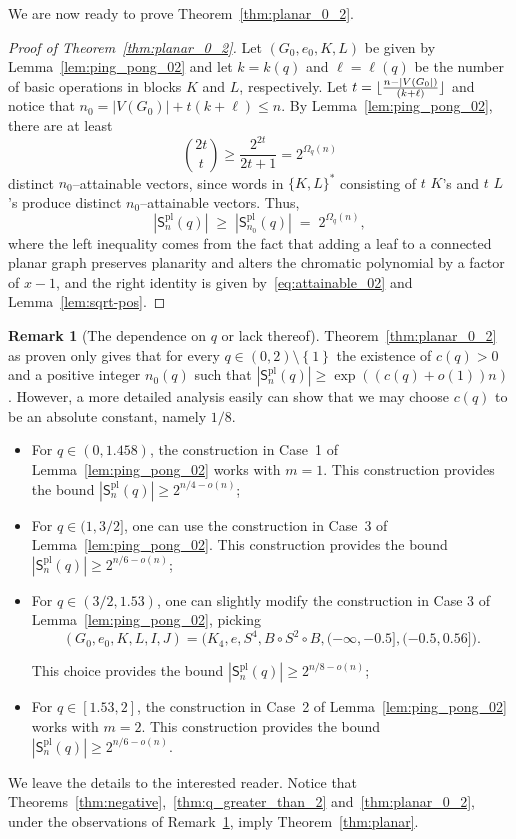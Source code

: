 \documentclass[A4paper,reqno,oneside,12pt]{amsart}
\theoremstyle{plain}
\theoremstyle{definition}
\newtheorem{remark}[theorem]{Remark}
\newcommand{\abs}[1]{\left| #1 \right|}
\newcommand{\of}[1]{\left( #1 \right)}
\DeclareMathOperator{\pl}{\mathrm{pl}}
\newcommand{\set}[1]{\left\{ #1 \right\}}
\begin{document}
We are now ready to prove Theorem~\ref{thm:planar_0_2}.

\begin{proof}[Proof of Theorem~\ref{thm:planar_0_2}]
Let $(G_0,e_0,K,L)$ be given by Lemma~\ref{lem:ping_pong_02} and let $k=k(q)$ and $\ell=\ell(q)$ be the number of basic operations in blocks $K$ and $L$, respectively. Let $t = \smash{ \lfloor \frac{n-|V(G_0|)}{(k+\ell)}\rfloor}$ and notice that $n_0 = |V(G_0)|+t(k+\ell) \le n$. By Lemma~\ref{lem:ping_pong_02}, there are at least
\begin{equation}\label{eq:attainable_02}
\binom{2t}{t} \ge \frac{2^{2t}}{2t+1} = 2^{\Omega_{q}(n)}  
\end{equation}
distinct $n_0$--attainable vectors, since words in $\{K,L\}^\ast$ consisting of $t$ $K$'s and $t$ $L$'s produce distinct $n_0$--attainable vectors. Thus,
\[
|\mathsf{S}^{\mathrm{pl}}_n(q)| \;\ge\; |\mathsf{S}^{\mathrm{pl}}_{n_0}(q)| \;=\;2^{\Omega_q(n)},
\]
where the left inequality comes from the fact that adding a leaf to a connected planar graph preserves planarity and alters the chromatic polynomial by a factor of $x-1$, and the right identity is given by~\eqref{eq:attainable_02} and Lemma~\ref{lem:sqrt-pos}.
\end{proof}
\begin{remark}[The dependence on $q$ or lack thereof]
    \label{rem:q_no_dependence}
    Theorem~\ref{thm:planar_0_2} as proven only gives that for every $q \in (0, 2) \setminus \set{1}$ the existence of $c(q) > 0$ and a positive integer $n_0(q)$ such that $\abs{\mathsf{S}_n^{\pl} (q)} \geq \exp\of{(c(q) +o(1)) n}$. However, a more detailed analysis easily can show that we may choose $c(q)$ to be an absolute constant, namely $1/8$. 
    \begin{itemize}
        \item For $q \in (0,1.458)$, the construction in Case~1 of Lemma~\ref{lem:ping_pong_02} works with $m = 1$. This construction provides the bound  $\abs{\mathsf{S}_n^{\pl} (q)} \geq 2^{n/4-o(n)}$;
        \item For $q \in (1,3/2]$, one can use the construction in Case~3 of Lemma~\ref{lem:ping_pong_02}. This construction provides the bound $\abs{\mathsf{S}_n^{\pl} (q) }\geq 2^{n / 6 - o(n)}$;
        
        \item For $q \in (3/2, 1.53)$, one can slightly modify the construction in Case 3 of Lemma~\ref{lem:ping_pong_02}, picking  \[(G_0,e_0,K,L,I,J)=
\big(K_4,e,S^4,B\circ S^2\circ B, (-\infty,-0.5], (-0.5, 0.56]\big).\]

This choice provides the bound $\abs{\mathsf{S}_n^{\pl} (q) }\geq 2^{n/ 8-o(n)}$;
    \item For $q\in [1.53,2]$, the construction in Case~2 of Lemma~\ref{lem:ping_pong_02} works with $m = 2$. This construction provides the bound $\abs{\mathsf{S}_n^{\pl} (q) }\geq 2^{n / 6 - o(n)}$.
    \end{itemize}
    We leave the details to the interested reader. Notice that Theorems~\ref{thm:negative},~\ref{thm:q_greater_than_2} and~\ref{thm:planar_0_2}, under the observations of Remark~\ref{rem:q_no_dependence}, imply Theorem~\ref{thm:planar}.
\end{remark}
\end{document}
